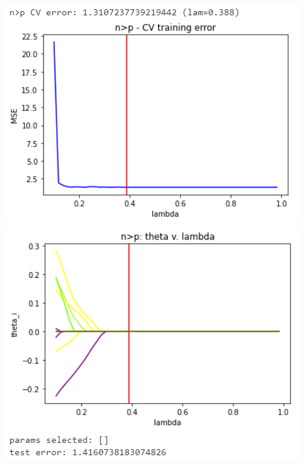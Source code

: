 \documentclass[11pt]{article}
\begin{document}
\begin{center}
\includegraphics[scale=0.7]{charts/ridge_exp_corr_n_gt_p_err.PNG}
\includegraphics[scale=0.7]{charts/ridge_exp_corr_n_gt_p_thetas.PNG}


\end{center}
\end{document}
